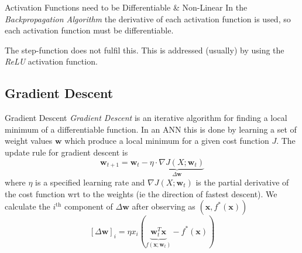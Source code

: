 \documentclass[11pt,a4paper]{article}
\begin{document}
  \begin{remark}{Activation Functions need to be Differentiable \& Non-Linear}
    In the \textit{Backpropagation Algorithm} the derivative of each activation function is used, so each activation function must be differentiable.
    \par The step-function does not fulfil this. This is addressed (usually) by using the \textit{ReLU} activation function.
  \end{remark}

%

\subsection{Gradient Descent} \label{sec_GradientDescent}

  \begin{definition}{Gradient Descent}
    \textit{Gradient Descent} is an iterative algorithm for finding a local minimum of a differentiable function. In an ANN this is done by learning a set of weight values $\pmb{w}$ which produce a local minimum for a given cost function $J$. The update rule for gradient descent is
    \[ \pmb{w}_{t+1}=\pmb{w}_t-\underbrace{\eta\cdot\nabla J(X;\pmb{w}_t)}_{\Delta\pmb{w}} \]
    where $\eta$ is a specified learning rate and $\nabla J(X;\pmb{w}_t)$ is the partial derivative of the cost function wrt to the weights (ie the direction of fastest descent). We calculate the $i^\text{th}$ component of $\Delta\pmb{w}$ after observing as $(\pmb{x},f^*(\pmb{x}))$
    \[ [\Delta\pmb{w}]_i=\eta x_i(\underbrace{\pmb{w}^T_t\pmb{x}}_{f(\pmb{x};\pmb{w}_t)}-f^*(\pmb{x})) \]
  \end{definition}
\end{document}
